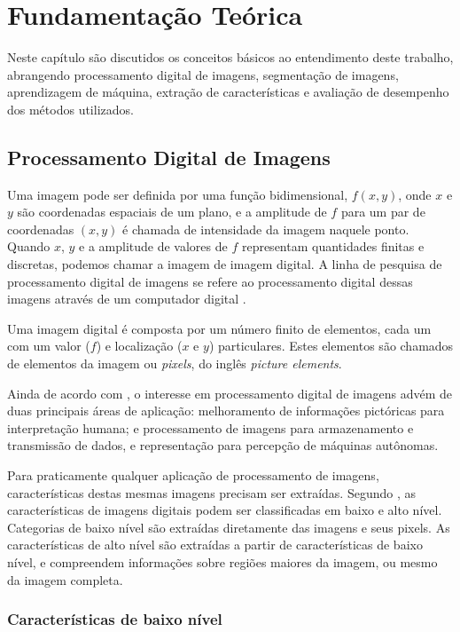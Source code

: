 \chapter{Fundamentação Teórica}\label{cap:fundamentacao}

Neste capítulo são discutidos os conceitos básicos ao entendimento deste trabalho, abrangendo processamento digital de imagens, segmentação de imagens, aprendizagem de máquina, extração de características e avaliação de desempenho dos métodos utilizados.

\section{Processamento Digital de Imagens}

Uma imagem pode ser definida por uma função bidimensional, $f(x,y)$, onde $x$ e $y$ são coordenadas espaciais de um plano, e a amplitude de $f$ para um par de coordenadas $(x,y)$ é chamada de intensidade da imagem naquele ponto. Quando $x$, $y$ e a amplitude de valores de $f$ representam quantidades finitas e discretas, podemos chamar a imagem de imagem  digital. A linha de pesquisa de processamento digital de imagens se refere ao processamento digital dessas imagens através de um computador digital \cite{gonzalez:2002}.

Uma imagem digital é composta por um número finito de elementos, cada um com um valor ($f$) e localização ($x$ e $y$) particulares. Estes elementos são chamados de elementos da imagem ou \textit{pixels}, do inglês \textit{picture elements}.

Ainda de acordo com , o interesse em processamento digital de imagens advém de duas principais áreas de aplicação: melhoramento de informações pictóricas para interpretação humana; e processamento de imagens para armazenamento e transmissão de dados, e representação para percepção de máquinas autônomas.

Para praticamente qualquer aplicação de processamento de imagens, características destas mesmas imagens precisam ser extraídas. Segundo , as características de imagens digitais podem ser classificadas em baixo e alto nível. Categorias de baixo nível são extraídas diretamente das imagens e seus pixels. As características de alto nível são extraídas a partir de características de baixo nível, e compreendem informações sobre regiões maiores da imagem, ou mesmo da imagem completa.

\subsection{Características de baixo nível}

